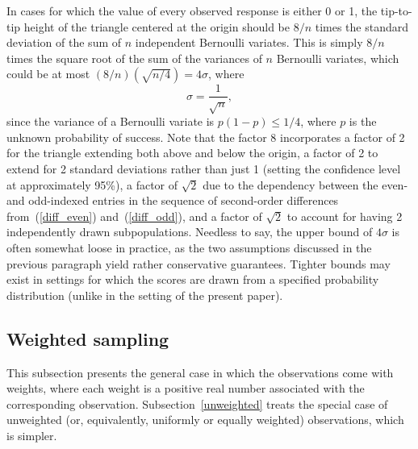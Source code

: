 \documentclass{article}
\begin{document}
In cases for which the value of every observed response is either 0 or 1,
the tip-to-tip height of the triangle centered at the origin should be $8/n$
times the standard deviation of the sum of $n$ independent Bernoulli variates.
This is simply $8/n$ times the square root of the sum of the variances
of $n$ Bernoulli variates, which could be at most
$(8/n)(\sqrt{n/4}) = 4\sigma$, where
%
\begin{equation}
\label{stddev}
\sigma = \frac{1}{\sqrt{n}},
\end{equation}
%
since the variance of a Bernoulli variate is $p(1-p) \le 1/4$,
where $p$ is the unknown probability of success.
Note that the factor 8 incorporates a factor of 2 for the triangle
extending both above and below the origin, a factor of 2 to extend
for 2 standard deviations rather than just 1
(setting the confidence level at approximately 95\%), a factor of $\sqrt{2}$
due to the dependency between the even- and odd-indexed entries
in the sequence of second-order differences from~(\ref{diff_even})
and~(\ref{diff_odd}), and a factor of $\sqrt{2}$ to account
for having 2 independently drawn subpopulations.
Needless to say, the upper bound of $4\sigma$ is often somewhat loose
in practice, as the two assumptions discussed in the previous paragraph
yield rather conservative guarantees.
Tighter bounds may exist in settings for which the scores are drawn
from a specified probability distribution
(unlike in the setting of the present paper).


\subsection{Weighted sampling}
\label{weighted}

This subsection presents the general case in which the observations
come with weights, where each weight is a positive real number
associated with the corresponding observation.
Subsection~\ref{unweighted} treats the special case of unweighted
(or, equivalently, uniformly or equally weighted) observations,
which is simpler.
\end{document}
